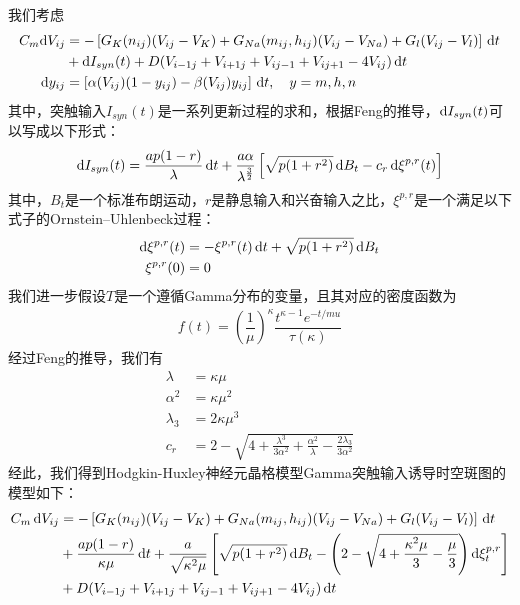 \documentclass[
pdflinks,
]{xjtuthesis}
\begin{document}
我们考虑
\begin{align}
\notag C_m \mathrm d V_{ij} &= -\left[G_{K} (n_{ij})(V_{ij} - V_{K}) + G_{Na}(m_{ij},h_{ij})(V_{ij}-V_{Na}) + G_{l} (V_{ij}- V_{l}) \right] \,\mathrm d t\\
&+ \mathrm d I_{syn}(t) +D(V_{i-1j}+V_{i+1j}+V_{ij-1}+V_{ij+1}-4V_{ij}) \,\mathrm d t\\
\mathrm d y_{ij} &= \left[\alpha (V_{ij})(1-y_{ij})-\beta (V_{ij})y_{ij}\right] \,\mathrm d t, \quad y=m,h,n
\end{align}
其中，突触输入$I_{syn}(t)$是一系列更新过程的求和，根据Feng\cite{feng2006dynamics}的推导，$\mathrm d I_{syn}(t)$可以写成以下形式：
\begin{align}
\mathrm d I_{syn}(t) = \frac{ap(1-r)}{\lambda} \,\mathrm d t + \frac{a \alpha}{\lambda^{\frac{3}{2}}} \left[\sqrt{p(1+r^2)} \,\mathrm d B_t - c_r \,\mathrm d \xi^{p,r}(t) \right]
\end{align}
其中，$B_t$是一个标准布朗运动，$r$是静息输入和兴奋输入之比，$\xi^{p,r}$是一个满足以下式子的Ornstein–Uhlenbeck过程：
\begin{align}
\mathrm d \xi^{p,r}(t) &= - \xi^{p,r}(t) \,\mathrm d t + \sqrt{p(1+r^2)} \,\mathrm d B_t \\
\notag \xi^{p,r}(0) & =0
\end{align}
我们进一步假设$T$是一个遵循Gamma分布的变量，且其对应的密度函数为
\begin{align}
f(t)=\left(\dfrac{1}{\mu}\right)^{\kappa} \dfrac{t^{\kappa-1}e^{-t/mu}}{\tau(\kappa)}
\end{align}
经过Feng\cite{feng2006dynamics}的推导，我们有
\begin{align}
\lambda &= \kappa \mu \\
\alpha ^2 &= \kappa \mu^2 \\
\lambda _3 &= 2 \kappa \mu^3 \\
c_r &= 2 - \sqrt{4+\frac{\lambda^3}{3\alpha^2}+\frac{\alpha^2}{\lambda}-\frac{2\lambda_3}{3\alpha^2}}
\end{align}
经此，我们得到Hodgkin-Huxley神经元晶格模型Gamma突触输入诱导时空斑图的模型如下：
\begin{align}
\notag C_m \ud V_{ij} &= -\left[\gk (n_{ij})(V_{ij} - \vk) + \gna(m_{ij},h_{ij})(V_{ij}-\vna) + \gl (V_{ij}- \vl) \right] \ud t \\
\notag & + \dfrac{ap(1-r)}{\kappa \mu} \ud t
+ \dfrac{a}{\sqrt{\kappa^2 \mu}} \left[ \sqrt{p(1+r^2)} \ud B_t -  \left(2-\sqrt{4+ \dfrac{\kappa^2 \mu}{3}-\dfrac{\mu}{3}} \right) 
\d \xi ^{p, r} _t \right]\\
& %
+ D(V_{i-1j}+V_{i+1j}+V_{ij-1}+V_{ij+1}-4V_{ij}) \ud t
\end{align}
\end{document}
